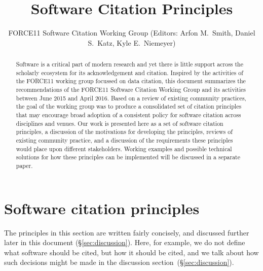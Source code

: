 \documentclass[11pt, oneside]{amsart}
\title{Software Citation Principles}
\author{FORCE11 Software Citation Working Group (Editors: Arfon M.~Smith, Daniel S.~Katz, Kyle E.~Niemeyer)}
\date{}
\newcommand{\katznote}[1]{ {\textcolor{blue} { ***DSK: #1 }}} %
\begin{document}
\begin{abstract}

\vspace{-0.2cm}
Software is a critical part of modern research and yet there is little support across the scholarly ecosystem for its acknowledgement and citation.
Inspired by the activities of the FORCE11 working group focussed on data citation, this document summarizes the recommendations of the FORCE11 Software Citation Working Group and its activities between June 2015 and April 2016.
Based on a review of existing community practices, the goal of the working group was to produce a consolidated set of citation principles that may encourage broad adoption of a consistent policy for software citation across disciplines and venues.
Our work is presented here as a set of software citation principles, a discussion of the motivations for developing the principles, reviews of existing community practice, and a discussion of the requirements these principles would place upon different stakeholders.
Working examples and possible technical solutions for how these principles can be implemented will be discussed in a separate paper.
\vspace{-1.0cm}

\end{abstract}

\maketitle

\section{Software citation principles}
\label{sec:principles}

The principles in this section are written fairly concisely, and discussed
further later in this document (\S\ref{sec:discussion}). Here, for example,
we do not define what software should be cited, but how it should be
cited, and we talk about how such decisions might be made in the
discussion section~(\S\ref{sec:discussion}).

\end{document}

